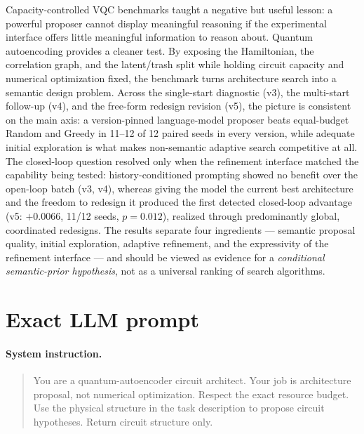 \documentclass[11pt]{article}
\begin{document}
Capacity-controlled VQC benchmarks taught a negative but useful lesson: a powerful proposer cannot display meaningful reasoning if the experimental interface offers little meaningful information to reason about.
Quantum autoencoding provides a cleaner test.
By exposing the Hamiltonian, the correlation graph, and the latent/trash split while holding circuit capacity and numerical optimization fixed, the benchmark turns architecture search into a semantic design problem.
Across the single-start diagnostic (v3), the multi-start follow-up (v4), and the free-form redesign revision (v5), the picture is consistent on the main axis: a version-pinned language-model proposer beats equal-budget Random and Greedy in 11--12 of 12 paired seeds in every version, while adequate initial exploration is what makes non-semantic adaptive search competitive at all.
The closed-loop question resolved only when the refinement interface matched the capability being tested: history-conditioned prompting showed no benefit over the open-loop batch (v3, v4), whereas giving the model the current best architecture and the freedom to redesign it produced the first detected closed-loop advantage (v5: $+0.0066$, 11/12 seeds, $p=0.012$), realized through predominantly global, coordinated redesigns.
The results separate four ingredients --- semantic proposal quality, initial exploration, adaptive refinement, and the expressivity of the refinement interface --- and should be viewed as evidence for a \emph{conditional semantic-prior hypothesis}, not as a universal ranking of search algorithms.

\appendix
\section{Exact LLM prompt}
\label{app:prompt}

\paragraph{System instruction.}
\begin{quote}
You are a quantum-autoencoder circuit architect. Your job is architecture proposal, not numerical optimization. Respect the exact resource budget. Use the physical structure in the task description to propose circuit hypotheses. Return circuit structure only.
\end{quote}
\end{document}
